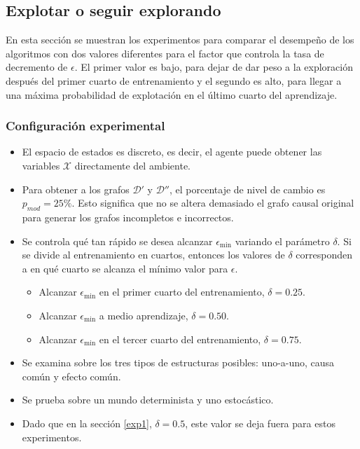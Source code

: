 
\subsection{Explotar o seguir explorando}\label{subsection:exp-epsilon}

En esta sección se muestran los experimentos para comparar
el desempeño de los algoritmos con dos valores diferentes para
el factor que controla la tasa de decremento de $\epsilon$. El primer valor 
es bajo, para dejar de dar peso a la exploración después del primer
cuarto de entrenamiento y el segundo es alto, para llegar a una máxima probabilidad
de explotación en el último cuarto del aprendizaje.

\subsubsection{Configuración experimental}

\begin{itemize}
    \item El espacio de estados es discreto, es decir, el agente puede
    obtener las variables $\mathcal{X}$ directamente del ambiente.
    \item Para obtener a los
    grafos $\mathcal{D'}$ y $\mathcal{D''}$,
    el porcentaje de nivel de cambio  es $p_{mod} = 25 \%$. Esto significa que no se altera demasiado el grafo causal original para
    generar los grafos incompletos e incorrectos.
    \item Se controla qué tan rápido se desea alcanzar $\epsilon_{\min}$ variando el parámetro $\delta$. Si se divide al entrenamiento en cuartos,  entonces los valores de $\delta$ corresponden a en qué cuarto se alcanza el mínimo valor para $\epsilon$.
    \begin{itemize}
        \item Alcanzar $\epsilon_{\min}$ en el primer cuarto del entrenamiento, $\delta = 0.25$.
        \item Alcanzar $\epsilon_{\min}$ a medio aprendizaje, $\delta = 0.50$.
        \item Alcanzar $\epsilon_{\min}$ en el tercer cuarto del entrenamiento, $\delta = 0.75$.
    \end{itemize}
    \item Se examina sobre los tres tipos de estructuras posibles: uno-a-uno, 
    causa común y efecto común. 
    \item Se prueba sobre un mundo determinista y uno estocástico.
    \item Dado que en la sección \ref{exp1}, $\delta=0.5$, este valor se deja fuera para estos experimentos.
\end{itemize}


